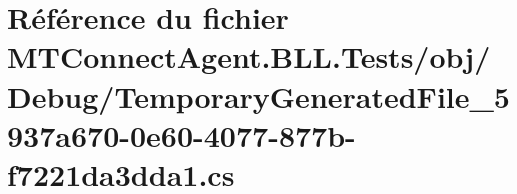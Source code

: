 \hypertarget{_m_t_connect_agent_8_b_l_l_8_tests_2obj_2_debug_2_temporary_generated_file__5937a670-0e60-4077-877b-f7221da3dda1_8cs}{}\section{Référence du fichier M\+T\+Connect\+Agent.\+B\+L\+L.\+Tests/obj/\+Debug/\+Temporary\+Generated\+File\+\_\+5937a670-\/0e60-\/4077-\/877b-\/f7221da3dda1.cs}
\label{_m_t_connect_agent_8_b_l_l_8_tests_2obj_2_debug_2_temporary_generated_file__5937a670-0e60-4077-877b-f7221da3dda1_8cs}
